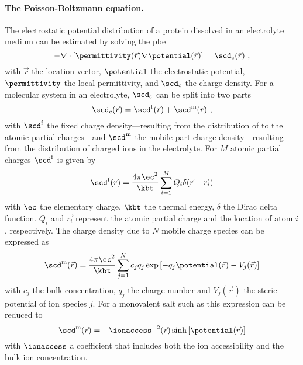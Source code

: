 \paragraph{The Poisson-Boltzmann equation.}
%
The electrostatic potential distribution of a protein dissolved in an electrolyte medium can be estimated by
solving the \gls{pbe}~\cite{Baker-2001,Baker-2005}
%
\begin{equation}\label{eq:pbe}
  - \nabla \cdot \left[ \permittivity (\vec{r}) \nabla \potential (\vec{r}) \right] = \scd_{\rm{c}} (\vec{r})
  \text{ ,}
\end{equation}
%
with $\vec{r}$ the location vector, $\potential$ the electrostatic potential, $\permittivity$ the local
permittivity, and $\scd_{\rm{c}}$ the charge density. For a molecular system in an electrolyte,
$\scd_{\rm{c}}$ can be split into two parts
%
\begin{equation}
  \scd_{\rm{c}} (\vec{r}) = \scd^{\rm{f}}(\vec{r}) + \scd^{\rm{m}}(\vec{r})
  \text{ ,}
\end{equation}
%
with $\scd^{\rm{f}}$ the fixed charge density---resulting from the distribution of to the atomic partial
charges---and $\scd^{\rm{m}}$ the mobile part charge density---resulting from the distribution of charged ions
in the electrolyte. For $M$ atomic partial charges $\scd^{\rm{f}}$ is given by~\cite{Baker-2001,Baker-2005}
%
\begin{equation}
  \scd^{\rm{f}}(\vec{r}) = \dfrac{4\pi\ec^2}{\kbt} \sum_{i=1}^{M} Q_i \delta(\vec{r} - \vec{r_i})
\end{equation}
%
with $\ec$ the elementary charge, $\kbt$ the thermal energy, $\delta$ the Dirac delta function. $Q_i$ and
$\vec{r_i}$ represent the atomic partial charge and the location of atom $i$, respectively. The charge density
due to $N$ mobile charge species can be expressed as~\cite{Baker-2001,Baker-2005}
%
\begin{equation}
  \scd^{\rm{m}}(\vec{r}) =
    \dfrac{4\pi\ec^2}{\kbt}
      \sum_{j=1}^{N} c_j q_j
      \exp{\left[- q_j \potential(\vec{r}) - V_j(\vec{r}) \right]}
\end{equation}
%
with $c_j$ the bulk concentration, $q_j$ the charge number and $V_j(\vec{r})$ the steric potential of ion
species $j$. For a monovalent salt such as  this expression can be reduced to
%
\begin{equation}
    \scd^{\rm{m}} (\vec{r}) = - \ionaccess^{-2} (\vec{r}) \sinh \left[ \potential (\vec{r}) \right]
\end{equation}
%
with $\ionaccess$ a coefficient that includes both the ion accessibility and the bulk ion concentration.

